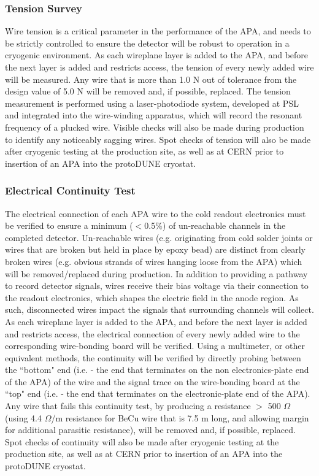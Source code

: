  
\subsubsection{Tension Survey}

Wire tension is a critical parameter in the performance of the APA, and needs to be strictly controlled to ensure the detector will be robust to operation in a cryogenic environment.  As each wireplane layer is added to the APA, and before the next layer is added and restricts access, the tension of every newly added wire will be measured.  Any wire that is more than 1.0 N out of tolerance from the design value of 5.0 N will be removed and, if possible, replaced.  The tension measurement is performed using a laser-photodiode system, developed at PSL and integrated into the wire-winding apparatus, which will record the resonant frequency of a plucked wire.  Visible checks will also be made during production to identify any noticeably sagging wires.  Spot checks of tension will also be made after cryogenic testing at the production site, as well as at CERN prior to insertion of an APA into the protoDUNE cryostat.  


\subsubsection{Electrical Continuity Test}

The electrical connection of each APA wire to the cold readout electronics must be verified to ensure a minimum ($<$0.5$\%$) of un-reachable channels in the completed detector.  Un-reachable wires (e.g. originating from cold solder joints or wires that are broken but held in place by epoxy bead) are distinct from clearly broken wires (e.g. obvious strands of wires hanging loose from the APA) which will be removed/replaced during production.   In addition to providing a pathway to record detector signals, wires receive their bias voltage via their connection to the readout electronics, which shapes the electric field in the anode region.  As such, disconnected wires impact the signals that surrounding channels will collect.  As each wireplane layer is added to the APA, and before the next layer is added and restricts access, the electrical connection of every newly added wire to the corresponding wire-bonding board will be verified.  Using a multimeter, or other equivalent methods, the continuity will be verified by directly probing between the ``bottom" end (i.e. - the end that terminates on the non electronics-plate end of the APA) of the wire and the signal trace on the wire-bonding board at the ``top" end (i.e. - the end that terminates on the electronic-plate end of the APA).  Any wire that fails this continuity test, by producing a resistance $>$ 500 $\Omega$ (using 4.4 $\Omega$/m resistance for BeCu wire that is 7.5 m long, and allowing margin for additional parasitic resistance), will be removed and, if possible, replaced.  Spot checks of continuity will also be made after cryogenic testing at the production site, as well as at CERN prior to insertion of an APA into the protoDUNE cryostat.

